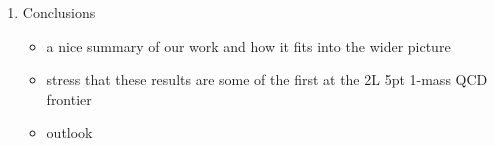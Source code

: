 \documentclass[main.tex]{subfiles}
\begin{document}
\begin{enumerate}
    \item Conclusions
    \begin{itemize}
        \item a nice summary of our work and how it fits into the wider picture
        \item stress that these results are some of the first at the 2L 5pt 1-mass QCD frontier
        \item outlook
    \end{itemize}
\end{enumerate}
\end{document}
